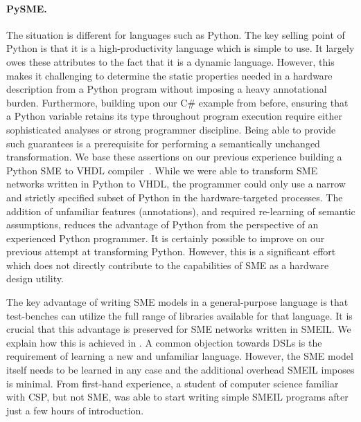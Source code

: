 \paragraph{PySME.}
The situation is different for languages such as Python. The key selling point
of Python is that it is a high-productivity language which is simple to use. It
largely owes these attributes to the fact that it is a dynamic
language. However, this makes it challenging to determine the static properties
needed in a hardware description from a Python program without imposing a heavy
annotational burden. Furthermore, building upon our C\# example from before,
ensuring that a Python variable retains its type throughout program execution
require either sophisticated analyses or strong programmer discipline. Being
able to provide such guarantees is a prerequisite for performing a semantically
unchanged transformation. We base these assertions on our previous experience
building a Python SME to VHDL compiler~\cite{asheim2016vhdl}. While we were able
to transform SME networks written in Python to VHDL, the programmer could only
use a narrow and strictly specified subset of Python in the hardware-targeted
processes. The addition of unfamiliar features (annotations), and required
re-learning of semantic assumptions, reduces the advantage of Python from the
perspective of an experienced Python programmer. It is certainly possible to
improve on our previous attempt at transforming Python. However, this is a
significant effort which does not directly contribute to the capabilities of SME
as a hardware design utility.


\vspace{1em} The key advantage of writing SME models in a general-purpose
language is that test-benches can utilize the full range of libraries available
for that language. It is crucial that this advantage is preserved for SME
networks written in SMEIL. We explain how this is achieved in
. A common objection towards DSLs is the requirement of learning
a new and unfamiliar language. However, the SME model itself needs to be learned
in any case and the additional overhead SMEIL imposes is minimal. From
first-hand experience, a student of computer science familiar with CSP, but not
SME, was able to start writing simple SMEIL programs after just a few hours of
introduction.

